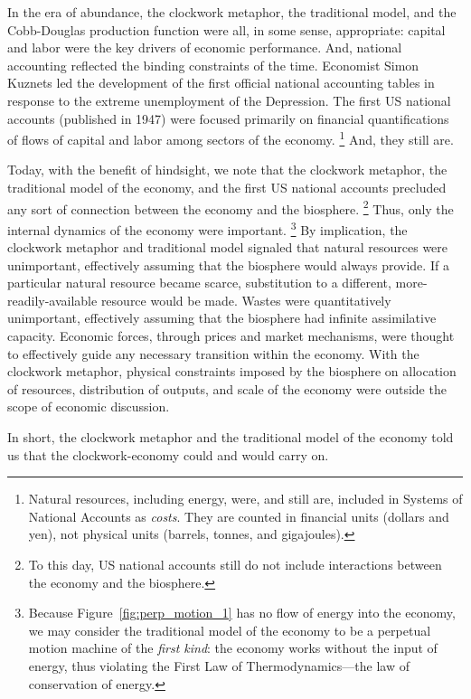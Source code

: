 In the era of abundance, 
the clockwork metaphor, 
the traditional model, 
and the Cobb-Douglas production function 
were all, in some sense, appropriate: 
capital and labor were the key drivers of economic performance.
And, national accounting reflected the binding constraints of the time. 
Economist Simon Kuznets led the development
of the first official national accounting tables
in response to the extreme unemployment of the Depression. 
The first US national accounts (published in 1947) 
were focused primarily on financial quantifications 
of flows of capital and labor
among sectors of the economy.%
	\footnote{
	Natural resources, including energy, were, and still are, 
	included in Systems of National Accounts as \emph{costs}.
	They are counted in financial units
	(dollars and yen), 
	not physical units
	(barrels, tonnes, and gigajoules).
	}
And, they still are. 

Today, with the benefit of hindsight, 
we note that the clockwork metaphor, the traditional model of the economy,
and the first US national accounts
precluded any sort of connection 
between the economy and the biosphere.%
	\footnote{
	To this day, US national accounts still do not include 
	interactions between the economy and the biosphere.
	}
Thus, only the internal dynamics of the economy were important.%
	\footnote{
	Because Figure~\ref{fig:perp_motion_1} has no flow of energy
	into the economy,
	we may consider the traditional model of the economy 
	to be a perpetual motion machine of the \emph{first kind}:
	the economy works without the input of energy, thus violating
	the First Law of Thermodynamics---the 
	law of conservation of energy.\cite{Rao2004}	
	}
By implication, the clockwork metaphor and traditional model 
signaled that natural resources were unimportant, 
effectively assuming that the biosphere would always provide.
If a particular natural resource became scarce, 
substitution to a different, more-readily-available resource would be made.
Wastes were quantitatively unimportant, 
effectively assuming that the biosphere had infinite assimilative capacity.
Economic forces,
through prices and market mechanisms,
were thought to effectively guide any necessary transition
within the economy.
With the clockwork metaphor, physical constraints 
imposed by the biosphere 
on allocation of resources, distribution of outputs, and 
scale of the economy 
were outside the scope of economic discussion.\cite{Daly1995}

In short, the clockwork metaphor and the traditional model of the economy 
told us that the clockwork-economy could and would carry on.

